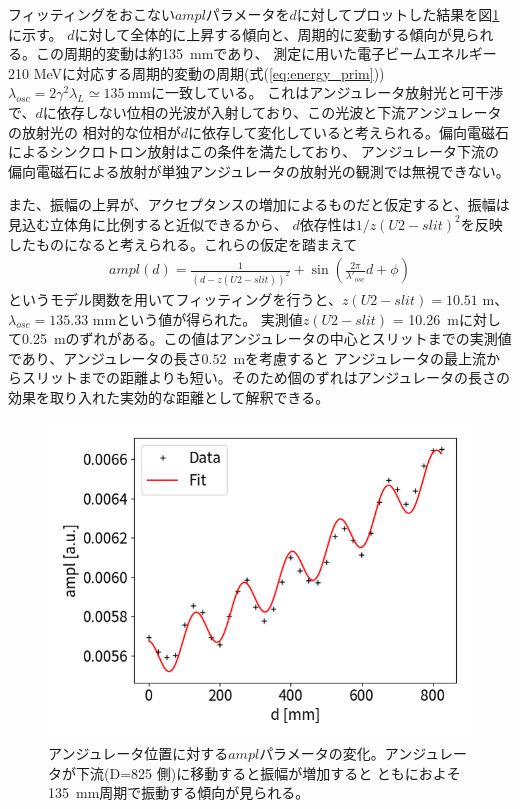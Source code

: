 \documentclass[a4paper,11pt,uplatex]{jsbook}
\begin{document}
フィッティングをおこない$ampl$パラメータを$d$に対してプロットした結果を図\ref{DCampl}に示す。
$d$に対して全体的に上昇する傾向と、周期的に変動する傾向が見られる。この周期的変動は約135~mmであり、
測定に用いた電子ビームエネルギー210 MeVに対応する周期的変動の周期(式(\ref{eq:energy_prim}))$\lambda_{osc} = 2\gamma^2\lambda_L \simeq 135~\text{mm}$に一致している。
これはアンジュレータ放射光と可干渉で、$d$に依存しない位相の光波が入射しており、この光波と下流アンジュレータの放射光の
相対的な位相が$d$に依存して変化していると考えられる。偏向電磁石によるシンクロトロン放射はこの条件を満たしており、
アンジュレータ下流の偏向電磁石による放射が単独アンジュレータの放射光の観測では無視できない。

また、振幅の上昇が、アクセプタンスの増加によるものだと仮定すると、振幅は見込む立体角に比例すると近似できるから、
$d$依存性は$1/z(U2-slit)^2$を反映したものになると考えられる。これらの仮定を踏まえて
\begin{eqnarray}
  ampl(d) = \frac{1}{(d - z(U2-slit))^2} + \sin\left( \frac{2\pi}{\lambda'_{osc}}d + \phi \right)\label{eq:ampl}
\end{eqnarray}
というモデル関数を用いてフィッティングを行うと、$z(U2-slit) = 10.51$ m、$\lambda_{osc}= 135.33$ mmという値が得られた。
実測値$z(U2-slit)$ = 10.26~mに対して0.25~mのずれがある。この値はアンジュレータの中心とスリットまでの実測値であり、アンジュレータの長さ$0.52$~mを考慮すると
アンジュレータの最上流からスリットまでの距離よりも短い。そのため個のずれはアンジュレータの長さの効果を取り入れた実効的な距離として解釈できる。

\begin{figure}[h]
  \centering
  \includegraphics[width=0.8\linewidth]{image/4-DCampl.png}
  \caption[アンジュレータ位置依存性]{アンジュレータ位置に対する$ampl$パラメータの変化。アンジュレータが下流(D=825 側)に移動すると振幅が増加すると
  ともにおよそ135~mm周期で振動する傾向が見られる。}\label{DCampl}
\end{figure}
\end{document}
